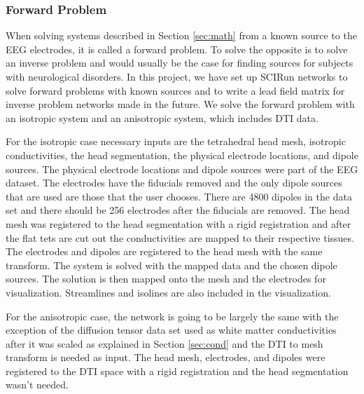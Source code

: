 \subsubsection{Forward Problem}

When solving systems described in Section \ref {sec:math} from a known source to the EEG electrodes, it is called a forward problem. To solve the opposite is to solve an inverse problem and would usually be the case for finding sources for subjects with neurological disorders. In this project, we have set up SCIRun networks to solve forward problems with known sources and to write a lead field matrix for inverse problem networks made in the future. We solve the forward problem with an isotropic system and an anisotropic system, which includes DTI data. 

For the isotropic case necessary inputs are the tetrahedral head mesh, isotropic conductivities, the head segmentation, the physical electrode locations, and dipole sources. The physical electrode locations and dipole sources were part of the EEG dataset. The electrodes have the fiducials removed and the only dipole sources that are used are those that the user chooses. There are 4800 dipoles in the data set and there should be 256 electrodes after the fiducials are removed. The head mesh was registered to the head segmentation with a rigid registration and after the flat tets are cut out the conductivities are mapped to their respective tissues. The electrodes and dipoles are registered to the head mesh with the same transform. The system is solved with the mapped data and the chosen dipole sources. The solution is then mapped onto the mesh and the electrodes for visualization. Streamlines and isolines are also included in the visualization.

For the anisotropic case, the network is going to be largely the same with the exception of the diffusion tensor data set used as white matter conductivities after it was scaled as explained in Section \ref{sec:cond} and the DTI to mesh transform is needed as input. The head mesh, electrodes, and dipoles were registered to the DTI space with a rigid registration and the head segmentation wasn't needed.

